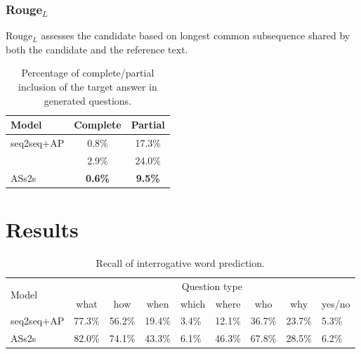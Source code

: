 \documentclass[letterpaper]{article} %
\newcommand\Tstrut{\rule{0pt}{2.3ex}}         %
\begin{document}
\subsubsection{Rouge\(_L\)}
Rouge\(_L\) assesses the candidate based on longest common subsequence shared by both the candidate and the reference text.

\begin{table}[!tb]
\centering
\begin{tabular}{|l|c|c|}
\hline
Model        & Complete & Partial\Tstrut  \\ \hline
seq2seq+AP & 0.8\%            & 17.3\%\Tstrut               \\ \hline
\cite{song2018leveraging}  & 2.9\%        & 24.0\%\Tstrut          \\ \hline
ASs2s    & \textbf{0.6\%}        & \textbf{9.5\%}\Tstrut           \\ \hline
\end{tabular}%
\caption{Percentage of complete/partial inclusion of the target answer in generated questions.}
\label{table:grasp answer}
\end{table}

\section{Results}

\begin{table}[!htb]
\centering
\begin{tabular}{|l|l|l|l|l|l|l|l|l|}
\hline
\multirow{2}{*}{Model} & \multicolumn{8}{c|}{Question type}\Tstrut  \\ \cline{2-9}
& \multicolumn{1}{c|}{what} & \multicolumn{1}{c|}{how} & \multicolumn{1}{c|}{when} & \multicolumn{1}{c|}{which} & \multicolumn{1}{c|}{where} & \multicolumn{1}{c|}{who} & \multicolumn{1}{c|}{why} & \multicolumn{1}{c|}{yes/no}\Tstrut  \\ \hline
seq2seq+AP & 77.3\% & 56.2\% & 19.4\% & 3.4\% & 12.1\% & 36.7\% & 23.7\% & 5.3\%\Tstrut  \\ \hline
ASs2s & 82.0\% & 74.1\% & 43.3\% & 6.1\% & 46.3\% & 67.8\% & 28.5\% & 6.2\%\Tstrut  \\ \hline
\end{tabular}
\caption{Recall of interrogative word prediction.}
\label{table:interrogative word}
\end{table}
\end{document}
